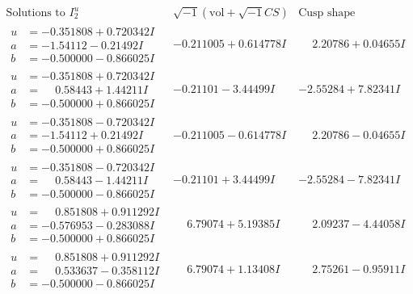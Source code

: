 \documentclass[1p]{elsarticle_modified}
\theoremstyle{definition}
\newcommand{\I}{\sqrt{-1}}
\begin{document}
$$\begin{array}{c|c|c}  
\text{Solutions to }I^u_{2}& \I (\text{vol} + \sqrt{-1}CS) & \text{Cusp shape}\\
 \hline 
\begin{aligned}
u &= -0.351808 + 0.720342 I \\
a &= -1.54112 - 0.21492 I \\
b &= -0.500000 - 0.866025 I\end{aligned}
 & -0.211005 + 0.614778 I & \phantom{-}2.20786 + 0.04655 I \\ \hline\begin{aligned}
u &= -0.351808 + 0.720342 I \\
a &= \phantom{-}0.58443 + 1.44211 I \\
b &= -0.500000 + 0.866025 I\end{aligned}
 & -0.21101 - 3.44499 I & -2.55284 + 7.82341 I \\ \hline\begin{aligned}
u &= -0.351808 - 0.720342 I \\
a &= -1.54112 + 0.21492 I \\
b &= -0.500000 + 0.866025 I\end{aligned}
 & -0.211005 - 0.614778 I & \phantom{-}2.20786 - 0.04655 I \\ \hline\begin{aligned}
u &= -0.351808 - 0.720342 I \\
a &= \phantom{-}0.58443 - 1.44211 I \\
b &= -0.500000 - 0.866025 I\end{aligned}
 & -0.21101 + 3.44499 I & -2.55284 - 7.82341 I \\ \hline\begin{aligned}
u &= \phantom{-}0.851808 + 0.911292 I \\
a &= -0.576953 - 0.283088 I \\
b &= -0.500000 + 0.866025 I\end{aligned}
 & \phantom{-}6.79074 + 5.19385 I & \phantom{-}2.09237 - 4.44058 I \\ \hline\begin{aligned}
u &= \phantom{-}0.851808 + 0.911292 I \\
a &= \phantom{-}0.533637 - 0.358112 I \\
b &= -0.500000 - 0.866025 I\end{aligned}
 & \phantom{-}6.79074 + 1.13408 I & \phantom{-}2.75261 - 0.95911 I \\ \hline\begin{aligned}

\end{aligned}
\end{array}$$
\end{document}
